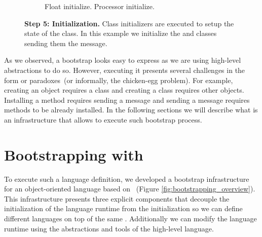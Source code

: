 \begin{figure}[ht]
\begin{subfigure}{.4\linewidth}
\begin{code}
Float initialize.
Processor initialize.
\end{code}
\end{subfigure}
\caption{\textbf{Step 5: Initialization.} Class initializers are executed to setup the state of the class. In this example we initialize the  and  classes sending them the  message.\label{fig:method_installation}}
\end{figure}




\noindent\newline As we observed, a bootstrap looks easy to express as we are using high-level abstractions to do so. However, executing it presents several challenges in the form or paradoxes~(or informally, the chicken-egg problem). For example, creating an object requires a class and creating a class requires other objects. Installing a method requires sending a message and sending a message requires methods to be already installed. In the following sections we will describe what is an infrastructure that allows to execute such bootstrap process.

\section{Bootstrapping with \Vtt}\label{sec:bootstrapping_infrastructure}

To execute such a language definition, we developed a bootstrap infrastructure for an object-oriented language based on \Vtt~(Figure \ref{fig:bootstrapping_overview}). This infrastructure presents three explicit components that decouple the initialization of the language runtime from the \VM initialization so we can define different languages on top of the same \VM. Additionally we can modify the language runtime using the abstractions and tools of the high-level language.

